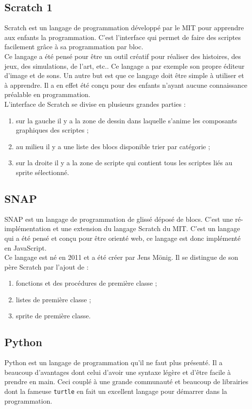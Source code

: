 \subsection{Scratch 1}
Scratch est un langage de programmation développé par le MIT pour apprendre aux enfants la programmation. C'est l'interface qui permet de faire des scriptes facilement grâce à sa programmation par bloc.\\

Ce langage a été pensé pour être un outil créatif pour réaliser des histoires, des jeux, des simulations, de l'art, etc.. Ce langage a par exemple son propre éditeur d'image et de sons. Un autre but est que ce langage doit être simple à utiliser et à apprendre. Il a en effet été conçu pour des enfants n'ayant aucune connaissance préalable en programmation.\\

L'interface de Scratch se divise en plusieurs grandes parties :

\begin{enumerate}
\item sur la gauche il y a la zone de dessin dans laquelle s'anime les composants graphiques des scriptes ;
\item au milieu il y a une liste des blocs disponible trier par catégorie ;
\item sur la droite il y a la zone de scripte qui contient tous les scriptes liés au sprite sélectionné.
\end{enumerate}

\subsection{SNAP}
SNAP est un langage de programmation de glissé déposé de blocs. C'est une ré-implémentation et une extension du langage Scratch du MIT. C'est un langage qui a été pensé et conçu pour être orienté web, ce langage est donc implémenté en JavaScript.\\

Ce langage est né en 2011 et a été créer par Jens Mönig. Il se distingue de son père Scratch par l'ajout de :
\begin{enumerate}
\item fonctions et des procédures de première classe ;
\item listes de première classe ;
\item sprite de première classe.
\end{enumerate}

\subsection{Python}
Python est un langage de programmation qu'il ne faut plus présenté. Il a beaucoup d'avantages dont celui d'avoir une syntaxe légère et d'être facile à prendre en main. Ceci couplé à une grande communauté et beaucoup de librairies dont la fameuse \texttt{turtle} en fait un excellent langage pour démarrer dans la programmation.

